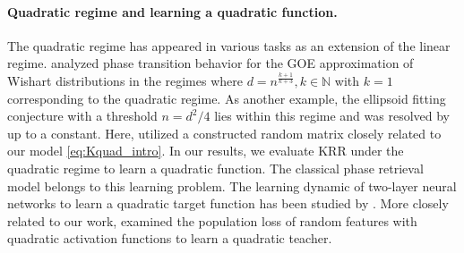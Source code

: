 \documentclass[twoside,11pt]{article}
\newcommand{\1}{\mathbf{1}}
\begin{document}
 
\paragraph{Quadratic regime and learning a quadratic function.} 
The quadratic regime has appeared in various tasks as an extension of the linear regime. \cite{chetelat2019middle} analyzed phase transition behavior for the GOE approximation of Wishart distributions in the regimes where $d=n^{\frac{k+1}{k+3}},k\in\mathbb N$ with $k=1$ corresponding to the quadratic regime. As another example, the ellipsoid fitting conjecture \citep{saunderson2013diagonal} with a threshold $n=d^2/4$ lies within this regime and was resolved by \cite{hsieh2023ellipsoid,tulsiani2023ellipsoid,bandeira2023fitting} up to a constant. Here, \cite{hsieh2023ellipsoid} utilized a constructed random matrix closely related to our model \eqref{eq:Kquad_intro}. 
In our results, we evaluate KRR under the quadratic regime to learn a quadratic function. 
The classical phase retrieval model \citep{walther1963question,balan2006signal} belongs to this learning problem. The learning dynamic of two-layer neural networks 
to learn a quadratic target function has been studied by \cite{sarao2020complex,arnaboldi2023escaping,martin2024impact}. More closely related to our work, \cite{ghorbani2019limitations} examined the population loss of random features with quadratic activation functions to learn a quadratic teacher.
\end{document}
